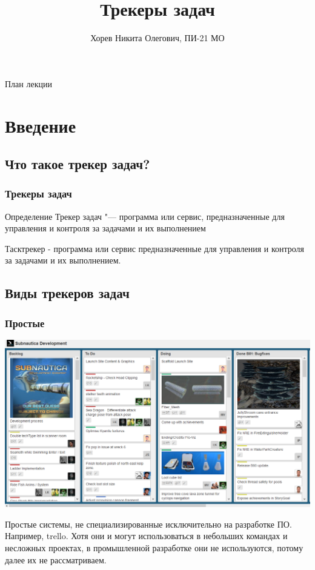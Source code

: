 \documentclass{../industrial-development}
\title{Трекеры задач}
\author{Хорев Никита Олегович, ПИ-21 МО}
\date{}
\begin{document}
\begin{frame}
  \titlepage
\end{frame}


\begin{frame}{План лекции}
  \tableofcontents
\end{frame}

\section{Введение}

\subsection{Что такое трекер задач?}

\begin{frame} \frametitle{Трекеры задач}
  \begin{block}{Определение}
    Трекер задач "--- программа или сервис, предназначенные для управления и контроля за задачами и их выполнением
  \end{block}
\end{frame}

\lecturenotes
Тасктрекер - программа или сервис предназначенные для управления и контроля за задачами и их выполнением.

\subsection{Виды трекеров задач}

\begin{frame} \frametitle{Простые}
	\centerline{\includegraphics[width=\textwidth]{trello.png}}
\end{frame}

\lecturenotes
Простые системы, не специализированные исключительно на разработке ПО. Например, trello. Хотя они и могут использоваться в небольших командах и несложных проектах, в промышленной разработке они не используются, потому далее их не рассматриваем.
\end{document}
